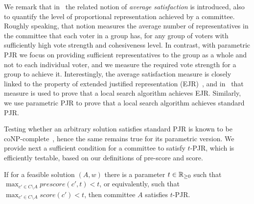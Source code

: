 
We remark that in~\cite{sanchez2017proportional} the related notion of \emph{average satisfaction} is introduced, also to quantify the level of proportional representation achieved by a committee. Roughly speaking, that notion measures the average number of representatives in the committee that each voter in a group has, for any group of voters with sufficiently high vote strength and cohesiveness level. 
In contrast, with parametric PJR we focus on providing sufficient representatives to the group as a whole and not to each individual voter, and we measure the required vote strength for a group to achieve it.
Interestingly, the average satisfaction measure is closely linked to the property of extended justified representation (EJR)~\cite{aziz2017justified}, and in~\cite{aziz2018complexity} that measure is used to prove that a local search algorithm achieves EJR. 
Similarly, we use parametric PJR to prove that a local search algorithm achieves standard PJR.

Testing whether an arbitrary solution satisfies standard PJR is known to be coNP-complete~\cite{aziz2018complexity}, hence the same remains true for its parametric version.
We provide next a sufficient condition for a committee to satisfy $t$-PJR, which is efficiently testable, based on our definitions of pre-score and score.  

\begin{lemma} \label{lem:locality}
If for a feasible solution $(A,w)$ there is a parameter $t\in\mathbb{R}_{\geq 0}$ such that $\max_{c'\in C\setminus A} prescore(c',t)<t$, or equivalently, such that $\max_{c'\in C\setminus A} score(c') <t$, then committee $A$ satisfies $t$-PJR. 
\end{lemma}

